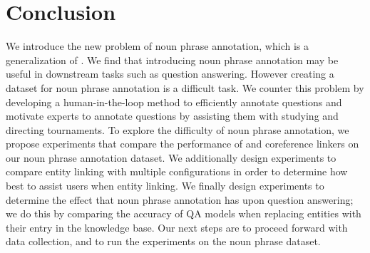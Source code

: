 \section{Conclusion}
\label{sec:conc}
We introduce the new problem of noun phrase annotation, which is a generalization of \nel{}. 
We find that introducing noun phrase annotation may be useful in downstream tasks such as question answering. 
However creating a dataset for noun phrase annotation is a difficult task. 
We counter this problem by developing a human-in-the-loop method to efficiently annotate questions and motivate experts to annotate questions by assisting them with studying and directing tournaments. 
To explore the difficulty of noun phrase annotation, we propose experiments that compare the performance of \nel{} and coreference linkers on our noun phrase annotation dataset. 
We additionally design experiments to compare entity linking with multiple configurations in order to determine how best to assist users when entity linking. 
We finally design experiments to determine the effect that noun phrase annotation has upon question answering; we do this by comparing the accuracy of QA models when replacing entities with their entry in the knowledge base. 
Our next steps are to proceed forward with data collection, and to run the experiments on the noun phrase dataset. 